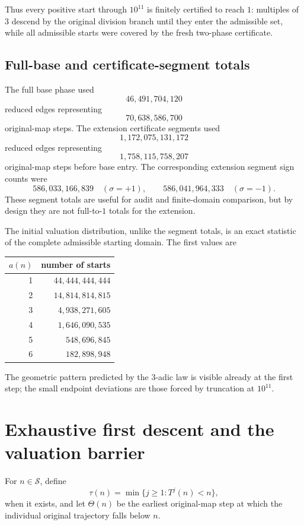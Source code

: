\documentclass[11pt]{article}
\theoremstyle{definition}
\theoremstyle{remark}
\begin{document}
Thus every positive start through $10^{11}$ is finitely certified to reach $1$: multiples of $3$ descend by the original division branch until they enter the admissible set, while all admissible starts were covered by the fresh two-phase certificate.

\subsection{Full-base and certificate-segment totals}

The full base phase used
\[
46{,}491{,}704{,}120
\]
reduced edges representing
\[
70{,}638{,}586{,}700
\]
original-map steps.  The extension certificate segments used
\[
1{,}172{,}075{,}131{,}172
\]
reduced edges representing
\[
1{,}758{,}115{,}758{,}207
\]
original-map steps before base entry.  The corresponding extension segment sign counts were
\[
586{,}033{,}166{,}839\quad(\sigma=+1),
\qquad
586{,}041{,}964{,}333\quad(\sigma=-1).
\]
These segment totals are useful for audit and finite-domain comparison, but by design they are not full-to-$1$ totals for the extension.

The initial valuation distribution, unlike the segment totals, is an exact statistic of the complete admissible starting domain.  The first values are
\begin{center}
\begin{tabular}{r r}
\toprule
$a(n)$ & number of starts \\
\midrule
1 & $44{,}444{,}444{,}444$ \\
2 & $14{,}814{,}814{,}815$ \\
3 & $4{,}938{,}271{,}605$ \\
4 & $1{,}646{,}090{,}535$ \\
5 & $548{,}696{,}845$ \\
6 & $182{,}898{,}948$ \\
\bottomrule
\end{tabular}
\end{center}
The geometric pattern predicted by the $3$-adic law is visible already at the first step; the small endpoint deviations are those forced by truncation at $10^{11}$.

\section{Exhaustive first descent and the valuation barrier}

For $n\in\mathcal S$, define
\[
\tau(n)=\min\{j\ge1:T^j(n)<n\},
\]
when it exists, and let $\Theta(n)$ be the earliest original-map step at which the individual original trajectory falls below $n$.
\end{document}
